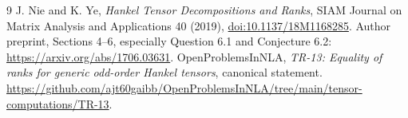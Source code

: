 \documentclass[11pt]{article}
\begin{document}
\begin{thebibliography}{9}
J. Nie and K. Ye, \emph{Hankel Tensor Decompositions and Ranks},
SIAM Journal on Matrix Analysis and Applications 40 (2019),
\href{https://doi.org/10.1137/18M1168285}{doi:10.1137/18M1168285}.
Author preprint, Sections 4--6, especially Question 6.1 and Conjecture 6.2:
\url{https://arxiv.org/abs/1706.03631}.
OpenProblemsInNLA, \emph{TR-13: Equality of ranks for generic odd-order
Hankel tensors}, canonical statement.
\url{https://github.com/ajt60gaibb/OpenProblemsInNLA/tree/main/tensor-computations/TR-13}.
\end{thebibliography}
\end{document}
